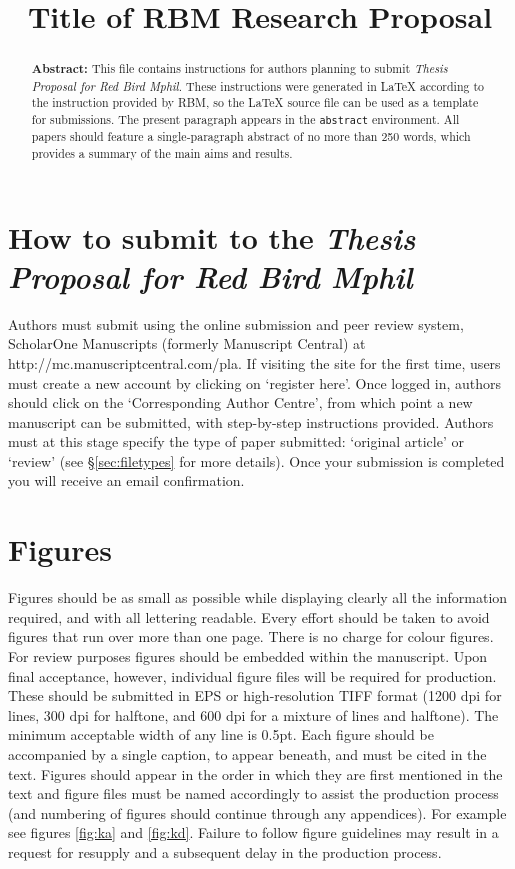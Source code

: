 \documentclass[12pt]{Style/RBM_P}
\title{Title of RBM Research Proposal}
\begin{document}

\doublespacing

\maketitle


\begin{abstract}
\textbf{Abstract: } This file contains instructions for authors planning to submit \textit{Thesis Proposal for Red Bird Mphil}. These instructions were generated in {\LaTeX} according to the instruction provided by RBM, so the {\LaTeX} source file can be used as a template for submissions. The present paragraph appears in the \verb|abstract| environment. All papers should feature a single-paragraph abstract of no more than 250 words, which provides a summary of the main aims and results.
\end{abstract}



\section{How to submit to the \textbf{\textit{Thesis Proposal for Red Bird Mphil}}}
Authors must submit using the online submission and peer review system, ScholarOne Manuscripts (formerly Manuscript Central) at http://mc.manuscriptcentral.com/pla. If visiting the site for the first time, users must create a new account by clicking on `register here'. Once logged in, authors should click on the `Corresponding Author Centre', from which point a new manuscript can be submitted, with step-by-step instructions provided. Authors must at this stage specify the type of paper submitted: `original article' or `review' (see \S\ref{sec:filetypes} for more details). Once your submission is completed you will receive an email confirmation.
 

\section{Figures}
Figures should be as small as possible while displaying clearly all the information required, and with all lettering readable. Every effort should be taken to avoid figures that run over more than one page. There is no charge for colour figures. For review purposes figures should be embedded within the manuscript. Upon final acceptance, however, individual figure files will be required for production. These should be submitted in EPS or high-resolution TIFF format (1200 dpi for lines, 300 dpi for halftone, and 600 dpi for a mixture of lines and halftone). The minimum acceptable width of any line is 0.5pt. Each figure should be accompanied by a single caption, to appear beneath, and must be cited in the text. Figures should appear in the order in which they are first mentioned in the text and figure files must be named accordingly to assist the production process (and numbering of figures should continue through any appendices). For example see figures \ref{fig:ka} and \ref{fig:kd}. Failure to follow figure guidelines may result in a request for resupply and a subsequent delay in the production process.
\end{document}
